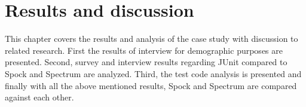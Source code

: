 \chapter{Results and discussion}
\label{chapter:results}

This chapter covers the results and analysis of the case study with discussion to related research.
First the results of interview for demographic purposes are
presented. Second, survey and interview results regarding JUnit compared to Spock and Spectrum are analyzed.  Third, the test
code analysis is presented and finally
with all the above mentioned results, Spock and Spectrum are compared against each other.



